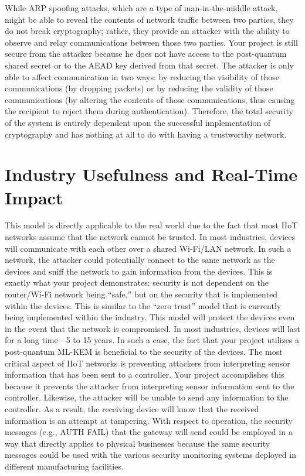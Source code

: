 \documentclass[a4paper]{scrartcl}
\begin{document}
        While ARP spoofing attacks, which are a type of man-in-the-middle attack, might be able to reveal the contents of network traffic between two parties, they do not break cryptography; rather, they provide an attacker with the ability to observe and relay communications between those two parties. Your project is still secure from the attacker because he does not have access to the post-quantum shared secret or to the AEAD key derived from that secret. The attacker is only able to affect communication in two ways: by reducing the visibility of those communications (by dropping packets) or by reducing the validity of those communications (by altering the contents of those communications, thus causing the recipient to reject them during authentication). Therefore, the total security of the system is entirely dependent upon the successful implementation of cryptography and has nothing at all to do with having a trustworthy network.

    \section{Industry Usefulness and Real-Time Impact}
    This model is directly applicable to the real world due to the fact that most IIoT networks assume that the network cannot be trusted. In most industries, devices will communicate with each other over a shared Wi-Fi/LAN network. In such a network, the attacker could potentially connect to the same network as the devices and sniff the network to gain information from the devices. This is exactly what your project demonstrates: security is not dependent on the router/Wi-Fi network being “safe,” but on the security that is implemented within the devices. This is similar to the “zero trust” model that is currently being implemented within the industry. This model will protect the devices even in the event that the network is compromised. In most industries, devices will last for a long time—5 to 15 years. In such a case, the fact that your project utilizes a post-quantum ML-KEM is beneficial to the security of the devices.
    The most critical aspect of IIoT networks is preventing attackers from interpreting sensor information that has been sent to a controller. Your project accomplishes this because it prevents the attacker from interpreting sensor information sent to the controller. Likewise, the attacker will be unable to send any information to the controller. As a result, the receiving device will know that the received information is an attempt at tampering. With respect to operation, the security messages (e.g., AUTH FAIL) that the gateway will send could be employed in a way that directly applies to physical businesses because the same security messages could be used with the various security monitoring systems deployed in different manufacturing facilities.
\end{document}
